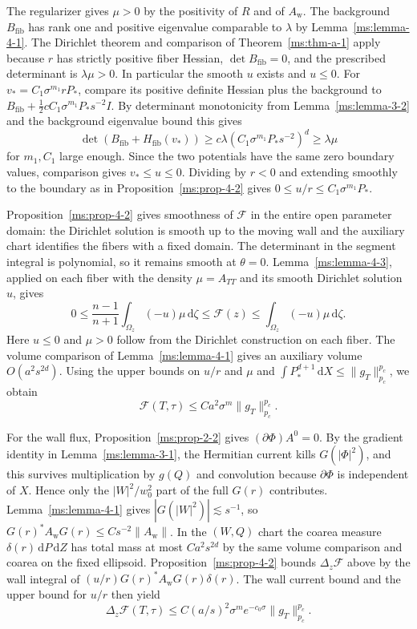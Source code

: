 The regularizer gives $\mu>0$ by the positivity of $R$ and of $A_{\mathrm w}$. The background $B_{\mathrm{fib}}$ has rank one and positive eigenvalue comparable to $\lambda$ by Lemma~\ref{ms:lemma-4-1}. The Dirichlet theorem and comparison of Theorem~\ref{ms:thm-a-1} apply because $r$ has strictly positive fiber Hessian, $\det B_{\mathrm{fib}}=0$, and the prescribed determinant is $\lambda\mu>0$. In particular the smooth $u$ exists and $u\le0$. For $v_*=C_1\sigma^{m_1}rP_*$, compare its positive definite Hessian plus the background to $B_{\mathrm{fib}}+\tfrac12 c C_1\sigma^{m_1}P_*s^{-2}I$. By determinant monotonicity from Lemma~\ref{ms:lemma-3-2} and the background eigenvalue bound this gives
\[
\det(B_{\mathrm{fib}}+H_{\mathrm{fib}}(v_*))
\ge c\lambda(C_1\sigma^{m_1}P_*s^{-2})^d\ge\lambda\mu
\]
for $m_1,C_1$ large enough. Since the two potentials have the same zero boundary values, comparison gives $v_*\le u\le0$. Dividing by $r<0$ and extending smoothly to the boundary as in Proposition~\ref{ms:prop-4-2} gives $0\le u/r\le C_1\sigma^{m_1}P_*$.

Proposition~\ref{ms:prop-4-2} gives smoothness of $\mathcal F$ in the entire open parameter domain: the Dirichlet solution is smooth up to the moving wall and the auxiliary chart identifies the fibers with a fixed domain. The determinant in the segment integral is polynomial, so it remains smooth at $\theta=0$. Lemma~\ref{ms:lemma-4-3}, applied on each fiber with the density $\mu=A_{TT}$ and its smooth Dirichlet solution $u$, gives
\[
 0\le \frac{n-1}{n+1}\int_{\Omega_z}(-u)\mu\,\mathrm d\zeta
 \le \mathcal F(z)\le \int_{\Omega_z}(-u)\mu\,\mathrm d\zeta .
\]
Here $u\le0$ and $\mu>0$ follow from the Dirichlet construction on each fiber. The volume comparison of Lemma~\ref{ms:lemma-4-1} gives an auxiliary volume $O(a^2s^{2d})$. Using the upper bounds on $u/r$ and $\mu$ and $\int P_*^{d+1}\,\mathrm dX\le\|g_T\|_{p_c}^{p_c}$, we obtain
\[
\mathcal F(T,\tau)\le Ca^2\sigma^m\|g_T\|_{p_c}^{p_c}.
\]

For the wall flux, Proposition~\ref{ms:prop-2-2} gives $(\partial\Phi)A^0=0$. By the gradient identity in Lemma~\ref{ms:lemma-3-1}, the Hermitian current kills $G(|\Phi|^2)$, and this survives multiplication by $g(Q)$ and convolution because $\partial\Phi$ is independent of $X$. Hence only the $|W|^2/w_0^2$ part of the full $G(r)$ contributes. Lemma~\ref{ms:lemma-4-1} gives $|G(|W|^2)|\lesssim s^{-1}$, so $G(r)^*A_{\mathrm w}G(r)\le Cs^{-2}\|A_{\mathrm w}\|$. In the $(W,Q)$ chart the coarea measure $\delta(r)\,\mathrm dP\,\mathrm dZ$ has total mass at most $Ca^2s^{2d}$ by the same volume comparison and coarea on the fixed ellipsoid. Proposition~\ref{ms:prop-4-2} bounds $\Delta_z\mathcal F$ above by the wall integral of $(u/r)G(r)^*A_{\mathrm w}G(r)\delta(r)$. The wall current bound and the upper bound for $u/r$ then yield
\[
\Delta_z\mathcal F(T,\tau)\le C(a/s)^2\sigma^me^{-c_0\sigma}\|g_T\|_{p_c}^{p_c}.
\]

